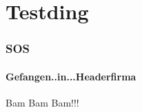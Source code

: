 \section{Testding}

\begin{frame}
\frametitle{SOS }
\framesubtitle{Gefangen..in...Headerfirma}

Bam Bam Bam!!!

\end{frame}